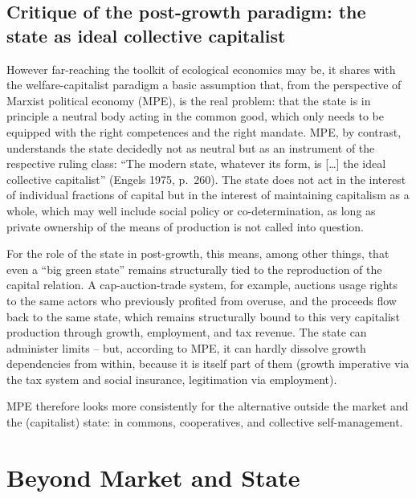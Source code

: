 \documentclass[
  british,
  a4paper,
  DIV=11,
  numbers=noendperiod,
  oneside,
  openany]{scrreprt}
\begin{document}
\subsection{Critique of the post-growth paradigm: the state as ideal
collective
capitalist}\label{critique-of-the-post-growth-paradigm-the-state-as-ideal-collective-capitalist}

However far-reaching the toolkit of ecological economics may be, it
shares with the welfare-capitalist paradigm a basic assumption that,
from the perspective of Marxist political economy (MPE), is the real
problem: that the state is in principle a neutral body acting in the
common good, which only needs to be equipped with the right competences
and the right mandate. MPE, by contrast, understands the state decidedly
not as neutral but as an instrument of the respective ruling class:
``The modern state, whatever its form, is {[}\ldots{]} the ideal
collective capitalist'' (Engels 1975, p.~260). The state does not act in
the interest of individual fractions of capital but in the interest of
maintaining capitalism as a whole, which may well include social policy
or co-determination, as long as private ownership of the means of
production is not called into question.

For the role of the state in post-growth, this means, among other
things, that even a ``big green state'' remains structurally tied to the
reproduction of the capital relation. A cap-auction-trade system, for
example, auctions usage rights to the same actors who previously
profited from overuse, and the proceeds flow back to the same state,
which remains structurally bound to this very capitalist production
through growth, employment, and tax revenue. The state can administer
limits -- but, according to MPE, it can hardly dissolve growth
dependencies from within, because it is itself part of them (growth
imperative via the tax system and social insurance, legitimation via
employment).

MPE therefore looks more consistently for the alternative outside the
market and the (capitalist) state: in commons, cooperatives, and
collective self-management.

\section{Beyond Market and State}\label{beyond-market-and-state}
\end{document}
